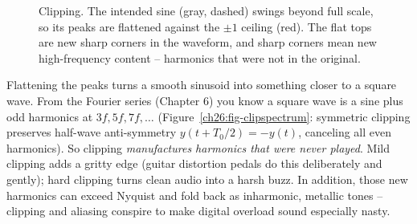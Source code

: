 \begin{figure}[H]
\centering
{}
\caption{Clipping. The intended sine (gray, dashed) swings beyond full scale, so its peaks are
flattened against the $\pm 1$ ceiling (red). The flat tops are new sharp corners in the waveform,
and sharp corners mean new high-frequency content -- harmonics that were not in the original.}
\label{ch26:fig-clip}
\end{figure}

\begin{happeningbox}
Flattening the peaks turns a smooth
sinusoid into something closer to a square wave. From the Fourier series (Chapter 6) you know a
square wave is a sine plus odd harmonics at $3f, 5f, 7f, \dots$ (Figure~\ref{ch26:fig-clipspectrum}: symmetric clipping preserves half-wave anti-symmetry $y(t+T_0/2)=-y(t)$, canceling all even harmonics).
So clipping \emph{manufactures harmonics that were never played}. Mild clipping adds a gritty edge (guitar distortion pedals do
this deliberately and gently); hard clipping turns clean audio into a harsh buzz. In addition, those
new harmonics can exceed Nyquist and fold back as inharmonic, metallic tones -- clipping and
aliasing conspire to make digital overload sound especially nasty.
\end{happeningbox}

